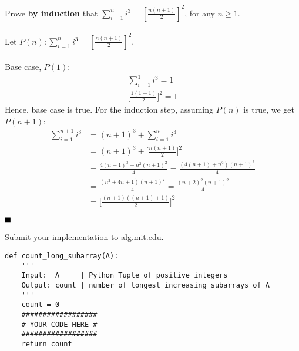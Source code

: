 \documentclass[12pt,twoside]{article}
\begin{document}
\begin{problems}
\problem Prove \textbf{by induction}  that 
         $\sum_{i=1}^{n} i^3 = [\frac{n(n+1)}{2}]^2  $,
         for any $n \geq 1$. \\ 
\\
\proof Let $P(n): \sum_{i=1}^{n} i^3 = [\frac{n(n+1)}{2}]^2  $.\\
    \\
    Base case, $P(1)$:  
    \begin{align}
        \sum_{i=1}^{1} i^3 = 1 \\
        \biggl[\frac{1(1+1)}{2}\biggr]^2 = 1
    \end{align}
    Hence, base case is true. For the induction step, assuming $P(n)$
    is true, we get $P(n+1)$:
    \begin{align}
        \sum_{i=1}^{n+1} i^{3} &= (n+1)^{3} + \sum_{i=1}^{n} i^{3}  \\
                                &= (n+1)^{3} + \biggl[\frac{n(n+1)}{2}\biggr]^2  \\
                                &= \frac{4(n+1)^3 + n^2(n+1)^2}{4}
                                 = \frac{(4(n+1) + n^2)(n+1)^2}{4} \\
                                &= \frac{(n^2 + 4n + 1)(n+1)^2}{4}  
                                 = \frac{(n+2)^2(n+1)^2}{4} \\
                                &= \biggl[\frac{(n+1)((n+1) + 1)}{2}\biggr]^{2}
    \end{align}

$\hfill \blacksquare$



\newpage
\problem  %

\vfill
\problem  %
Submit your implementation to {\small\url{alg.mit.edu}}.

\begin{lstlisting}
def count_long_subarray(A):
    '''
    Input:  A     | Python Tuple of positive integers
    Output: count | number of longest increasing subarrays of A
    '''
    count = 0
    ##################
    # YOUR CODE HERE #
    ##################
    return count
\end{lstlisting}

\end{problems}
\end{document}
